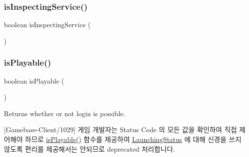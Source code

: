 \subsubsection{\texorpdfstring{is\+Inspecting\+Service()}{isInspectingService()}}
{\footnotesize\ttfamily boolean is\+Inspecting\+Service (\begin{DoxyParamCaption}{ }\end{DoxyParamCaption})}

\mbox{\label{classcom_1_1toast_1_1android_1_1gamebase_1_1launching_1_1data_1_1_launching_status_a4e7246a0ecb5d31951a58d042ad07cb7}} 
\subsubsection{\texorpdfstring{is\+Playable()}{isPlayable()}}
{\footnotesize\ttfamily boolean is\+Playable (\begin{DoxyParamCaption}{ }\end{DoxyParamCaption})}



Returns whether or not login is possible. 

\mbox{[}Gamebase-\/\+Client/1029\mbox{]} 게임 개발자는 Status Code 의 모든 값을 확인하여 직접 제어해야 하므로 \hyperlink{classcom_1_1toast_1_1android_1_1gamebase_1_1launching_1_1data_1_1_launching_status_a4e7246a0ecb5d31951a58d042ad07cb7}{is\+Playable()} 함수를 제공하여 \hyperlink{classcom_1_1toast_1_1android_1_1gamebase_1_1launching_1_1data_1_1_launching_status}{Launching\+Status} 에 대해 신경을 쓰지 않도록 편리를 제공해서는 안되므로 deprecated 처리합니다.

